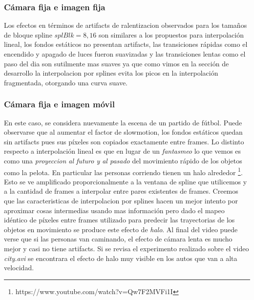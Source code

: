 \subsubsection{Cámara fija e imagen fija}
Los efectos en términos de artifacts de ralentizacion observados para los tamaños de bloque spline $splBlk = 8, 16$ son similares a los propuestos para interpolación lineal, los fondos estáticos no presentan artifacts, las transiciones rápidas como el encendido y apagado de luces fueron suavizadas y las transiciones lentas como el paso del dia son sutilmente mas suaves ya que como vimos en la sección de desarrollo la interpolacion por splines evita los picos en la interpolación fragmentada, otorgando una curva suave.

\subsubsection{Cámara fija e imagen móvil}
En este caso, se considera nuevamente la escena de un partido de fútbol. Puede observarse que al aumentar el factor de slowmotion, los fondos estáticos quedan sin artifacts pues sus píxeles son copiados exactamente entre frames. Lo distinto respecto a interpolación lineal es que en lugar de un \emph{fantasmeo} lo que vemos es como una \emph{proyeccion al futuro y al pasado} del movimiento rápido de los objetos como la pelota. En particular las personas corriendo tienen un halo alrededor \footnote{https://www.youtube.com/watch?v=Qw7F2MVFi1I}. Esto se ve amplificado proporcionalmente a la ventana de spline que utilicemos y a la cantidad de frames a interpolar entre pares existentes de frames. Creemos que las caracteristicas de interpolacion por splines hacen un mejor intento por aproximar cosas intermedias usando mas información pero dado el mapeo idéntico de píxeles entre frames utilizado para predecir las trayectorias de los objetos en movimiento se produce este efecto de \emph{halo}. Al final del video puede verse que si las personas van caminando, el efecto de cámara lenta es mucho mejor y casi no tiene artifacts.
Si se revisa el experimento realizado sobre el video \emph{city.avi} se encontrara el efecto de halo muy visible en los autos que van a alta velocidad. 


